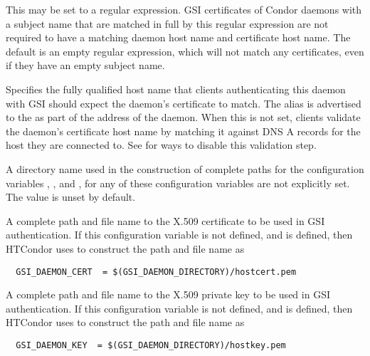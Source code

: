 \begin{description}
\label{param:GSISkipHostCheckCertRegex}
\item[\Macro{GSI\_SKIP\_HOST\_CHECK\_CERT\_REGEX}]
  This may be set to a regular expression.  GSI certificates of Condor
  daemons with a subject name that are matched in full by this regular
  expression are not required to have a matching daemon host name and
  certificate host name.  
  The default is an empty regular expression,
  which will not match any certificates,
  even if they have an empty subject name.

\label{param:HostAlias}
\item[\Macro{HOST\_ALIAS}] Specifies the fully qualified
  host name that clients authenticating this daemon with GSI should
  expect the daemon's certificate to match.  The alias is advertised
  to the  as part of the address of the daemon.
  When this is not set, clients validate the daemon's certificate
  host name by matching it against DNS A records for the host they
  are connected to.  See  for ways
  to disable this validation step.

\label{param:GSIDaemonDirectory}
\item[\Macro{GSI\_DAEMON\_DIRECTORY}]
  A directory name used in the
  construction of complete paths for the configuration variables
  ,
  , and
  ,
  for any of these configuration variables are not explicitly set.
  The value is unset by default. 

\label{param:GSIDaemonCert}
\item[\Macro{GSI\_DAEMON\_CERT}]
  A complete path and file name to the
  X.509 certificate to be used in GSI authentication.
  If this configuration variable is not defined, and
   is defined, then HTCondor uses
   to construct the path and file name as
  \begin{verbatim}
  GSI_DAEMON_CERT  = $(GSI_DAEMON_DIRECTORY)/hostcert.pem
  \end{verbatim}

\label{param:GSIDaemonKey}
\item[\Macro{GSI\_DAEMON\_KEY}]
  A complete path and file name to the
  X.509 private key to be used in GSI authentication.
  If this configuration variable is not defined, and
   is defined, then HTCondor uses
   to construct the path and file name as
  \begin{verbatim}
  GSI_DAEMON_KEY  = $(GSI_DAEMON_DIRECTORY)/hostkey.pem
  \end{verbatim}


\end{description}
